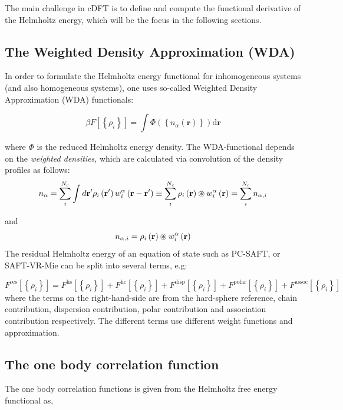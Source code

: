 \documentclass[12pt, letterpaper]{article}
\newcommand*{\lb}{\ensuremath{\left(}}
\newcommand*{\rb}{\ensuremath{\right)}}
\begin{document}
The main challenge in cDFT is to define and compute the functional derivative of the Helmholtz energy, which will be the focus in the following sections.

\subsection{The Weighted Density Approximation (WDA)}
In order to formulate the Helmholtz energy functional for inhomogeneous systems (and also homogeneous systems), one uses so-called Weighted Density Approximation (WDA) functionals:

\begin{equation}
\beta F\left[\left\{\rho_i\right\}\right]=\int\Phi\left(\left\{n_\alpha\left(\mathbf{r}\right)\right\}\right)\text{d}\mathbf{r}
\end{equation}

where $\Phi$ is the reduced Helmholtz energy density. The WDA-functional depends on the \emph{weighted densities}, which are calculated via convolution of the density profiles as follows:
\begin{equation}
  n_\alpha = \sum_i^{N_c}\int d \mathbf{r}^\prime \rho_i\left(\mathbf{r}^\prime\right) w_{i}^\alpha \lb \mathbf{r} - \mathbf{r}^\prime \rb \equiv \sum_i^{N_c}\rho_i \lb\mathbf{r}\rb \circledast w_i^\alpha\lb\mathbf{r}\rb=\sum_i^{N_c}n_{\alpha,i}
  \label{eq:wrho}
\end{equation}

and
\begin{equation}
  n_{\alpha,i} = \rho_i \lb\mathbf{r}\rb \circledast w_i^\alpha\lb\mathbf{r}\rb
  \label{eq:wrho}
\end{equation}
The residual Helmholtz energy of an equation of state such as PC-SAFT, or SAFT-VR-Mie can be split into several terms, e.g:

\begin{equation}
F^{\text{res}}\left[\left\{\rho_i\right\}\right]=F^{\text{hs}}\left[\left\{\rho_i\right\}\right]+F^{\text{hc}}\left[\left\{\rho_i\right\}\right]+F^{\text{disp}}\left[\left\{\rho_i\right\}\right]+F^{\text{polar}}\left[\left\{\rho_i\right\}\right]+F^{\text{assoc}}\left[\left\{\rho_i\right\}\right]
\end{equation}
where the terms on the right-hand-side are from the hard-sphere reference, chain contribution, dispersion contribution, polar contribution and association contribution respectively. The different terms use different  weight functions and approximation.

\subsection{The one body correlation function}
The one body correlation functions is given from the Helmholtz free energy functional as,
\end{document}
